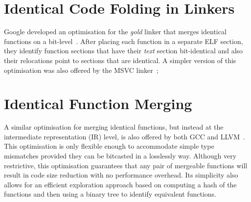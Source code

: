 
\section{Identical Code Folding in Linkers}

Google developed an optimisation for the \textit{gold} linker that merges
identical functions on a bit-level~\cite{tallam10,kwan12}.
After placing each function in a separate ELF section, they identify function
sections that have their \textit{text} section bit-identical and also their
relocations point to sections that are identical. A simpler version of this
optimisation was also offered by the MSVC linker~\cite{msvc-icf};

\section{Identical Function Merging}

A similar optimisation for merging identical functions, but instead at the
intermediate representation (IR) level, is also offered by both GCC and
LLVM~\cite{llvm-fm,livska14}.
This optimisation is only flexible enough to accommodate simple type mismatches
provided they can be bitcasted in a losslessly way.
Although very restrictive, this optimisation guarantees that any pair of
mergeable functions will result in code size reduction with no performance
overhead.
Its simplicity also allows for an efficient exploration approach based on computing
a hash of the functions and then using a binary tree to identify equivalent
functions.



